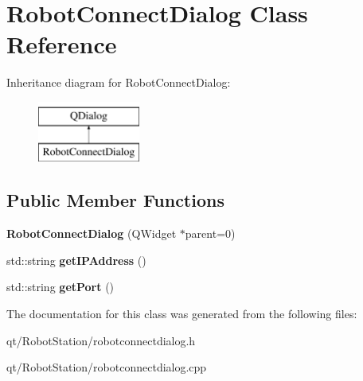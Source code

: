 \hypertarget{classRobotConnectDialog}{}\section{Robot\+Connect\+Dialog Class Reference}
\label{classRobotConnectDialog}
Inheritance diagram for Robot\+Connect\+Dialog\+:\begin{figure}[H]
\begin{center}
\leavevmode
\includegraphics[height=2.000000cm]{classRobotConnectDialog}
\end{center}
\end{figure}
\subsection*{Public Member Functions}
\begin{DoxyCompactItemize}
\item 
\hypertarget{classRobotConnectDialog_afc50098da2f50179bb5f39c68c39efaa}{}{\bfseries Robot\+Connect\+Dialog} (Q\+Widget $\ast$parent=0)\label{classRobotConnectDialog_afc50098da2f50179bb5f39c68c39efaa}

\item 
\hypertarget{classRobotConnectDialog_ae70640758f8facacf04d0e3dec9ba3ed}{}std\+::string {\bfseries get\+I\+P\+Address} ()\label{classRobotConnectDialog_ae70640758f8facacf04d0e3dec9ba3ed}

\item 
\hypertarget{classRobotConnectDialog_a4ba40c51051147b3049248293ab6c744}{}std\+::string {\bfseries get\+Port} ()\label{classRobotConnectDialog_a4ba40c51051147b3049248293ab6c744}

\end{DoxyCompactItemize}


The documentation for this class was generated from the following files\+:\begin{DoxyCompactItemize}
\item 
qt/\+Robot\+Station/robotconnectdialog.\+h\item 
qt/\+Robot\+Station/robotconnectdialog.\+cpp\end{DoxyCompactItemize}
